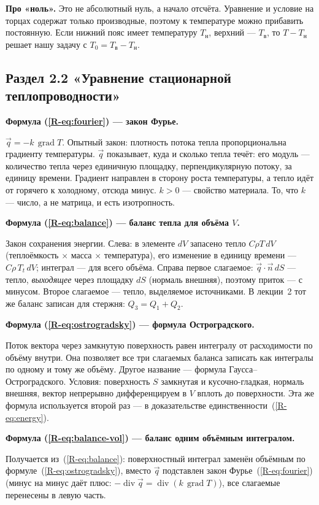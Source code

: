 \documentclass[a4paper,12pt]{article}
\newcommand{\rf}[1]{(\ref*{R-#1})}
\DeclareMathOperator{\Div}{div}
\DeclareMathOperator{\Grad}{grad}
\newcommand{\fhead}[2]{\par\medskip\textbf{Формула #1 — #2.}\par\nopagebreak[4]}
\begin{document}
\textbf{Про «ноль».} Это не абсолютный нуль, а начало отсчёта. Уравнение и
условие на торцах содержат только производные, поэтому к температуре можно
прибавить постоянную. Если нижний пояс имеет температуру $T_{\text{н}}$,
верхний — $T_{\text{в}}$, то $T-T_{\text{н}}$ решает нашу задачу с
$T_0=T_{\text{в}}-T_{\text{н}}$.

\subsection{Раздел 2.2 «Уравнение стационарной теплопроводности»}

\fhead{\rf{eq:fourier}}{закон Фурье}
$\vec q=-k\,\Grad T$. Опытный закон: плотность потока тепла пропорциональна
градиенту температуры. $\vec q$ показывает, куда и сколько тепла течёт:
его модуль — количество тепла через единичную площадку, перпендикулярную
потоку, за единицу времени. Градиент направлен в сторону роста температуры,
а тепло идёт от горячего к холодному, отсюда минус. $k>0$ — свойство
материала. То, что $k$ — число, а не матрица, и есть изотропность.

\fhead{\rf{eq:balance}}{баланс тепла для объёма $V$}
Закон сохранения энергии. Слева: в элементе $dV$ запасено тепло
$C\rho T\,dV$ (теплоёмкость $\times$ масса $\times$ температура), его
изменение в единицу времени — $C\rho\,T_t\,dV$; интеграл — для всего объёма.
Справа первое слагаемое: $\vec q\cdot\vec n\,dS$ — тепло, \emph{выходящее}
через площадку $dS$ (нормаль внешняя), поэтому приток — с минусом. Второе
слагаемое — тепло, выделяемое источниками. В лекции~2 тот же баланс записан
для стержня: $Q_3=Q_1+Q_2$.

\fhead{\rf{eq:ostrogradsky}}{формула Остроградского}
Поток вектора через замкнутую поверхность равен интегралу от расходимости
по объёму внутри. Она позволяет все три слагаемых баланса записать как
интегралы по одному и тому же объёму. Другое название — формула
Гаусса–Остроградского. Условия: поверхность $S$ замкнутая и
кусочно-гладкая, нормаль внешняя, вектор непрерывно дифференцируем в $V$
вплоть до поверхности. Эта же формула используется второй раз — в
доказательстве единственности~\rf{eq:energy}.

\fhead{\rf{eq:balance-vol}}{баланс одним объёмным интегралом}
Получается из~\rf{eq:balance}: поверхностный интеграл заменён объёмным по
формуле~\rf{eq:ostrogradsky}, вместо $\vec q$ подставлен закон
Фурье~\rf{eq:fourier} (минус на минус даёт плюс: $-\Div\vec q=\Div(k\,\Grad T)$),
все слагаемые перенесены в левую часть.
\end{document}
